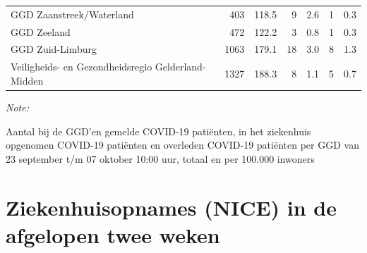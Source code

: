 \documentclass[
  english,
  man,floatsintext]{apa6}
\begin{document}
\begin{table}
\begin{threeparttable}
\begin{tabular}{lrrrrrr}
GGD Zaanstreek/Waterland & 403 & 118.5 & 9 & 2.6 & 1 & 0.3\\
GGD Zeeland & 472 & 122.2 & 3 & 0.8 & 1 & 0.3\\
GGD Zuid-Limburg & 1063 & 179.1 & 18 & 3.0 & 8 & 1.3\\
Veiligheids- en Gezondheidsregio Gelderland-Midden & 1327 & 188.3 & 8 & 1.1 & 5 & 0.7\\
\bottomrule
\end{tabular}
\begin{tablenotes}
\item \textit{Note: } 
\item Aantal bij de GGD’en gemelde COVID-19 patiënten, in het ziekenhuis opgenomen COVID-19 patiënten en overleden COVID-19 patiënten per GGD van 23 september t/m 07 oktober 10:00 uur, totaal en per 100.000 inwoners
\end{tablenotes}
\end{threeparttable}
\endgroup{}
\end{table}

\newpage

\hypertarget{ziekenhuisopnames-nice-in-de-afgelopen-twee-weken}{%
\section{Ziekenhuisopnames (NICE) in de afgelopen twee weken}\label{ziekenhuisopnames-nice-in-de-afgelopen-twee-weken}}
\end{document}
